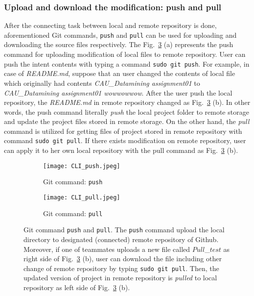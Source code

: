 \documentclass{article}
\begin{document}
\subsubsection{Upload and download the modification: push and pull}
\hspace*{2mm}After the connecting task between local and remote repository is done, aforementioned Git commands, \texttt{push} and \texttt{pull} can be used for uploading and downloading the source files respectively. The Fig.~\ref{fig:CLI_push_pull} (a) represents the push command for uploading modification of local files to remote repository. User can push the intent contents with typing a command \texttt{sudo git push}. For example, in case of \textit{README.md}, suppose that an user changed the contents of local file which originally had contents \textit{CAU\_Datamining assignment01} to \textit{CAU\_Datamining assignment01 wowwowwow}. After the user push the local repository, the \textit{README.md} in remote repository changed as Fig.~\ref{fig:CLI_push_pull} (b). In other words, the push command literally \textit{push} the local project folder to remote storage and update the project files stored in remote storage. On the other hand, the \textit{pull} command is utilized for getting files of project stored in remote repository with command \texttt{sudo git pull}. If there exists modification on remote repository, user can apply it to her own local repository with the pull command as Fig.~\ref{fig:CLI_push_pull} (b).

\begin{figure}[t]
        \centering
        \begin{subfigure}[b]{0.475\textwidth}
            \centering
            \texttt{[image: CLI\_push.jpeg]}
            \caption[Network2]%
            {{\small Git command: \texttt{push}}}    
            \label{fig:mean and std of net14}
        \end{subfigure}
        \hfill
        \begin{subfigure}[b]{0.475\textwidth}  
            \centering 
            \texttt{[image: CLI\_pull.jpeg]}
             \caption[Network2]%
            {{\small Git command: \texttt{pull}}}    
            \label{fig:mean and std of net24}
        \end{subfigure}
        \caption[Network2]%
        {\small Git command \texttt{push} and \texttt{pull}. The \texttt{push} command upload the local directory to designated (connected) remote repository of Github. Moreover, if one of teammates uploads a new file called $Pull$\_$test$ as right side of Fig.~\ref{fig:CLI_push_pull} (b), user can download the file including other change of remote repository by typing \texttt{sudo git pull}. Then, the updated version of project in remote repository is \textit{pulled} to local repository as left side of Fig.~\ref{fig:CLI_push_pull} (b).} 
        \label{fig:CLI_push_pull}
\end{figure}
 
\end{document}
